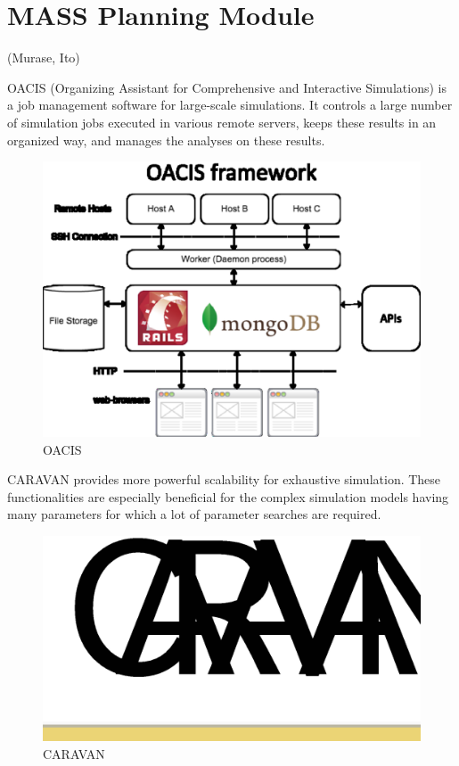 \section{MASS Planning Module}
\label{s:MASS Planning Module}

(Murase, Ito)

OACIS (Organizing Assistant for Comprehensive and Interactive
Simulations) is a job management software for large-scale
simulations. It controls a large number of simulation jobs executed in
various remote servers, keeps these results in an organized way, and
manages the analyses on these results.

\begin{figure}
  \centering
  \includegraphics[width=.8\linewidth]{Figs.noda/figure-02.oacis.eps}
  \caption{OACIS}
  \label{fig:Figs.noda/figure-02.oacis.eps}
\end{figure}

CARAVAN provides more powerful scalability for exhaustive
simulation. These functionalities are especially beneficial for the
complex simulation models having many parameters for which a lot of
parameter searches are required.

\begin{figure}
  \centering
  \includegraphics[width=.8\linewidth]{Figs.noda/figure-03.caravan.eps}
  \caption{CARAVAN}
  \label{fig:Figs.noda/figure-03.caravan.eps}
\end{figure}
